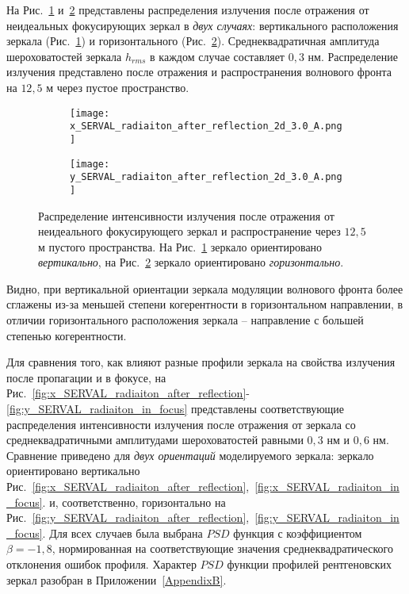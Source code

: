 На Рис.~\ref{fig:x_SERVAL_radiaiton_after_reflection_2d_3A} и~\ref{fig:y_SERVAL_radiaiton_after_reflection_2d_3A} представлены распределения излучения после отражения от неидеальных фокусирующих зеркал в \textit{двух случаях}: вертикального расположения зеркала (Рис.~\ref{fig:x_SERVAL_radiaiton_after_reflection_2d_3A}) и горизонтального (Рис.~\ref{fig:y_SERVAL_radiaiton_after_reflection_2d_3A}). Среднеквадратичная амплитуда шероховатостей зеркала $h_{rms}$ в каждом случае составляет $0,3$ нм. Распределение излучения представлено после отражения и распространения волнового фронта на $12,5$ м через пустое пространство.
\begin{figure}[H]
	\centering
	\begin{subfigure}{0.49\textwidth}
		\centering
		\texttt{[image: x\_SERVAL\_radiaiton\_after\_reflection\_2d\_3.0\_A.png]}
		\caption{}
		\label{fig:x_SERVAL_radiaiton_after_reflection_2d_3A}
	\end{subfigure}
	\begin{subfigure}{0.49\textwidth}
		\centering
		\texttt{[image: y\_SERVAL\_radiaiton\_after\_reflection\_2d\_3.0\_A.png]}
		\caption{}
		\label{fig:y_SERVAL_radiaiton_after_reflection_2d_3A}
	\end{subfigure}
	\caption{Распределение интенсивности излучения после отражения от неидеального фокусирующего зеркал и распространение через $12,5$ м пустого пространства. На Рис.~\ref{fig:x_SERVAL_radiaiton_after_reflection_2d_3A} зеркало ориентировано \textit{вертикально}, на Рис.~\ref{fig:y_SERVAL_radiaiton_after_reflection_2d_3A} зеркало ориентировано \textit{горизонтально}.}
	\label{fig:SERVAL_radiaiton_after_reflection_2d_3A}
\end{figure}
\noindent Видно, при вертикальной ориентации зеркала модуляции волнового фронта более сглажены из-за меньшей степени когерентности в горизонтальном направлении, в отличии горизонтального расположения зеркала -- направление с большей степенью когерентности.

Для сравнения того, как влияют разные профили зеркала на свойства излучения после пропагации и в фокусе, на Рис.~\ref{fig:x_SERVAL_radiaiton_after_reflection}-\ref{fig:y_SERVAL_radiaiton_in_focus} представлены соответствующие распределения интенсивности излучения после отражения от зеркала со среднеквадратичными амплитудами шероховатостей равными $0,3$ нм и $0,6$ нм. Сравнение приведено для \textit{двух ориентаций} моделируемого зеркала: зеркало ориентировано вертикально Рис.~\ref{fig:x_SERVAL_radiaiton_after_reflection},~\ref{fig:x_SERVAL_radiaiton_in_focus}. и, соответственно, горизонтально на Рис.~\ref{fig:y_SERVAL_radiaiton_after_reflection},~\ref{fig:y_SERVAL_radiaiton_in_focus}. Для всех случаев была выбрана $PSD$ функция с коэффициентом $\beta = -1,8$, нормированная на соответствующие значения среднеквадратического отклонения ошибок профиля. Характер $PSD$ функции профилей рентгеновских зеркал разобран в Приложении~\ref{AppendixB}.

